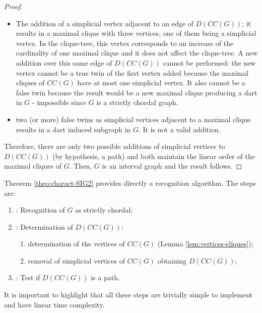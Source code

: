 \documentclass[preprint,12pt]{elsarticle}
\begin{document}
\begin{proof}
\begin{itemize}
\item[ii] The addition of a simplicial vertex adjacent to an edge of $D(CC(G))$;
it results in a maximal clique
with three vertices, one of them being a simplicial vertex.
In the clique-tree, this vertex corresponds to an increase of the cardinality of one maximal clique
and it does not affect the clique-tree.
A new addition over this same edge of $D(CC(G))$ cannot be performed: 
the new vertex cannot be a true twin of the first vertex added 
because the maximal cliques of $CC(G)$ have at most one simplicial vertex.
It also cannot be a false twin because the result would be a new maximal clique 
producing a dart in $G$ - impossible since $G$ is a strictly chordal graph.

\item[iii] two (or more) false twins as simplicial vertices adjacent to a maximal clique results 
in a dart induced subgraph in $G$. It is not a valid addition.
\end{itemize}

Therefore, there are only two possible additions of simplicial vertices to $D(CC(G))$ (by hypothesis, a path) 
and both maintain the linear order of the maximal cliques of $G$. 
Then, $G$ is an interval graph and the result follows.
\end{proof}


Theorem \ref{theo:charact-SIG2}  provides directly  a recognition algorithm.
The steps are:

\bigskip

\begin{enumerate}
\item[\it{Step 1}]: Recognition of $G$ as strictly chordal;
\item[\it{Step 2}]: Determination of $D(CC(G))$: 
    \begin{enumerate}
        \item determination of the vertices of $CC(G)$ (Lemma \ref{lem:vertices-cliques});
        \item removal of simplicial vertices of $CC(G)$ obtaining $D(CC(G))$;
    \end{enumerate} 
\item[\it{Step 3}]: Test if $D(CC(G))$ is a path.
\end{enumerate}

\bigskip

It is important to highlight that all these steps are trivially simple to implement and have linear time complexity.
\end{document}
